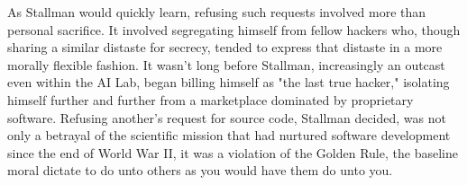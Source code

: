 




\ifdefined\eng
As Stallman would quickly learn, refusing such requests involved more than personal sacrifice. It involved segregating himself from fellow hackers who, though sharing a similar distaste for secrecy, tended to express that distaste in a more morally flexible fashion. It wasn't long before Stallman, increasingly an outcast even within the AI Lab, began billing himself as "the last true hacker," isolating himself further and further from a marketplace dominated by proprietary software. Refusing another's request for source code, Stallman decided, was not only a betrayal of the scientific mission that had nurtured software development since the end of World War II, it was a violation of the Golden Rule, the baseline moral dictate to do unto others as you would have them do unto you.
\fi

